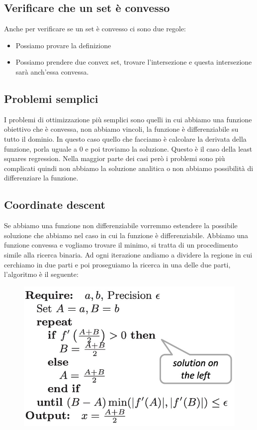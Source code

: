 \documentclass[14pt]{extreport}
\begin{document}
\subsection{Verificare che un set è convesso}

Anche per verificare se un set è convesso ci sono due regole:

\begin{itemize}
\item Possiamo provare la definizione
\item Possiamo prendere due convex set, trovare l'intersezione e questa intersezione sarà anch'essa convessa.
\end{itemize}


\subsection{Problemi semplici}

I problemi di ottimizzazione più semplici sono quelli in cui abbiamo una funzione obiettivo che è convessa, non abbiamo vincoli, la funzione è
differenziabile su tutto il dominio. In questo caso quello che facciamo è calcolare la derivata della funzione, porla uguale a 0 e poi troviamo la
soluzione. Questo è il caso della least squares regression. Nella maggior parte dei casi però i problemi sono più complicati quindi non abbiamo la
soluzione analitica o non abbiamo possibilità di differenziare la funzione.

\subsection{Coordinate descent}

Se abbiamo una funzione non differenziabile vorremmo estendere la possibile soluzione che abbiamo nel caso in cui la funzione è differenziabile.
Abbiamo una funzione convessa e vogliamo trovare il minimo, si tratta di un procedimento simile alla ricerca binaria. Ad ogni iterazione andiamo a
dividere la regione in cui cerchiamo in due parti e poi proseguiamo la ricerca in una delle due parti, l'algoritmo è il seguente:

\begin{figure}[H]
\centering
\includegraphics[width=0.7\linewidth]{236.jpeg}
\end{figure}
\end{document}
